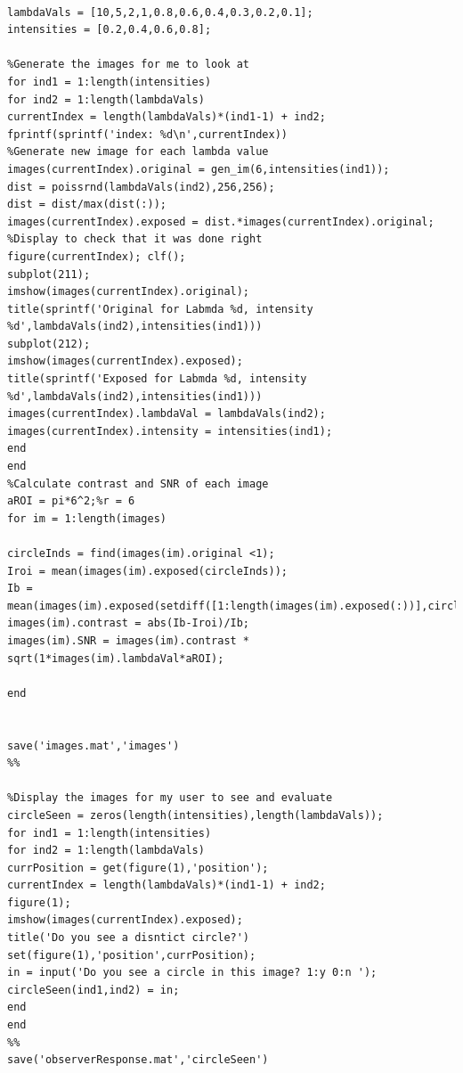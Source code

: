 \documentclass[12pt]{article}
\begin{document}
\begin{lstlisting}[style=Matlab-editor]
%%

lambdaVals = [10,5,2,1,0.8,0.6,0.4,0.3,0.2,0.1];
intensities = [0.2,0.4,0.6,0.8];

%Generate the images for me to look at
for ind1 = 1:length(intensities)
for ind2 = 1:length(lambdaVals)
currentIndex = length(lambdaVals)*(ind1-1) + ind2;
fprintf(sprintf('index: %d\n',currentIndex))
%Generate new image for each lambda value
images(currentIndex).original = gen_im(6,intensities(ind1));
dist = poissrnd(lambdaVals(ind2),256,256);
dist = dist/max(dist(:));
images(currentIndex).exposed = dist.*images(currentIndex).original;
%Display to check that it was done right
figure(currentIndex); clf();
subplot(211);
imshow(images(currentIndex).original);
title(sprintf('Original for Labmda %d, intensity %d',lambdaVals(ind2),intensities(ind1)))
subplot(212);
imshow(images(currentIndex).exposed);
title(sprintf('Exposed for Labmda %d, intensity %d',lambdaVals(ind2),intensities(ind1)))
images(currentIndex).lambdaVal = lambdaVals(ind2);
images(currentIndex).intensity = intensities(ind1);
end
end
%Calculate contrast and SNR of each image
aROI = pi*6^2;%r = 6
for im = 1:length(images)

circleInds = find(images(im).original <1);
Iroi = mean(images(im).exposed(circleInds));
Ib = mean(images(im).exposed(setdiff([1:length(images(im).exposed(:))],circleInds)));
images(im).contrast = abs(Ib-Iroi)/Ib;
images(im).SNR = images(im).contrast * sqrt(1*images(im).lambdaVal*aROI);

end


save('images.mat','images')
%%

%Display the images for my user to see and evaluate
circleSeen = zeros(length(intensities),length(lambdaVals));
for ind1 = 1:length(intensities)
for ind2 = 1:length(lambdaVals)
currPosition = get(figure(1),'position');
currentIndex = length(lambdaVals)*(ind1-1) + ind2;
figure(1);
imshow(images(currentIndex).exposed);
title('Do you see a disntict circle?')
set(figure(1),'position',currPosition);
in = input('Do you see a circle in this image? 1:y 0:n ');
circleSeen(ind1,ind2) = in;
end
end
%%
save('observerResponse.mat','circleSeen')
\end{lstlisting}
\end{document}
